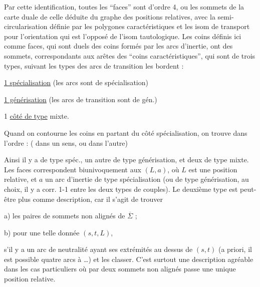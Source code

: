 Par cette identification, toutes les ``faces'' sont d'ordre 4, ou les sommets de la  carte duale de celle déduite du graphe des positions relatives, avec la semi-circularisation définie par les polygones caractéristiques et les isom de transport pour l'orientation qui est l'opposé de l'isom tautologique. Les coins définis ici comme faces, qui sont duels des coins formés par les arcs d'inertie, ont des sommets, correspondants aux arêtes des ``coins caractéristiques'', qui sont de trois types, suivant les types des arcs de transition  les bordent :

\uline{1  spécialisation} (les arcs  sont de spécialisation)

\uline{1  générisation} (les arcs de transition sont de gén.)

1 \uline{côté de type} mixte.

Quand on contourne les coins en partant du côté spécialisation, on trouve dans l'ordre :
( dans un sens, ou dans l'autre)

Ainsi il y a  de type spéc., un autre de type générisation, et deux de type mixte. Les faces correspondent biunivoquement aux  $(L,a)$, où $L$ est une position relative, et $a$ un arc  d'inertie de type spécialisation (ou de type générisation, au choix, il y a corr. 1-1 entre les deux types de couples). Le deuxième type est peut-être plus  comme description, car il s'agit de trouver

a) les paires de sommets  non alignés de $\overline\Sigma$ ;

b) pour une telle donnée $(s,t,L)$,

s'il y a un arc de neutralité ayant  ses extrémités au dessus de $(s,t)$ (a priori, il est possible quatre arcs à \ldots) et les classer. C'est surtout une description agréable dans les cas  particuliers où par deux sommets non alignés passe une unique position relative.

